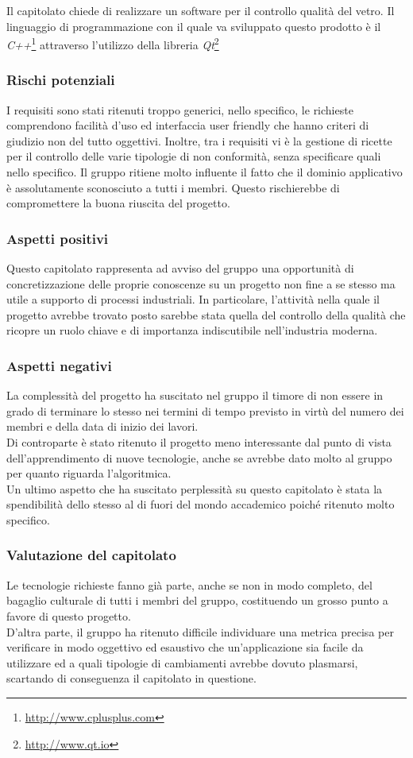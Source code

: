 Il capitolato chiede di realizzare un software per il controllo qualità del vetro. Il linguaggio di programmazione con il quale va sviluppato questo prodotto è il \textit{C++}\footnote{\url{http://www.cplusplus.com}} attraverso l'utilizzo della libreria \textit{Qt}\footnote{\url{http://www.qt.io}}
\subsubsection{Rischi potenziali}
I requisiti sono stati ritenuti troppo generici, nello specifico, le richieste comprendono facilità d'uso ed interfaccia user friendly che hanno criteri di giudizio non del tutto oggettivi.
Inoltre, tra i requisiti vi è la gestione di ricette per il controllo delle varie tipologie di non conformità, senza specificare quali nello specifico.
Il gruppo \GRUPPO{} ritiene molto influente il fatto che il dominio applicativo è assolutamente sconosciuto a tutti i membri. Questo rischierebbe di compromettere la buona riuscita del progetto.
\subsubsection{Aspetti positivi}
Questo capitolato rappresenta ad avviso del gruppo una opportunità di concretizzazione delle proprie conoscenze su un progetto non fine a se stesso ma utile a supporto di processi industriali. In particolare, l'attività nella quale il progetto avrebbe trovato posto sarebbe stata quella del controllo della qualità che ricopre un ruolo chiave e di importanza indiscutibile nell'industria moderna.
\subsubsection{Aspetti negativi}
La complessità del progetto ha suscitato nel gruppo il timore di non essere in grado di terminare lo stesso nei termini di tempo previsto in virtù del numero dei membri e della data di inizio dei lavori. \\
Di controparte è stato ritenuto il progetto meno interessante dal punto di vista dell'apprendimento di nuove tecnologie, anche se avrebbe dato molto al gruppo per quanto riguarda l'algoritmica.\\
Un ultimo aspetto che ha suscitato perplessità su questo capitolato è stata la spendibilità dello stesso al di fuori del mondo accademico poiché ritenuto molto specifico.
\subsubsection{Valutazione del capitolato}
Le tecnologie richieste fanno già parte, anche se non in modo completo, del bagaglio culturale di tutti i membri del gruppo, costituendo un grosso punto a favore di questo progetto. \\
D'altra parte, il gruppo ha ritenuto difficile individuare una metrica precisa per verificare in modo oggettivo ed esaustivo che un'applicazione sia facile da utilizzare ed a quali tipologie di cambiamenti avrebbe dovuto plasmarsi, scartando di conseguenza il capitolato in questione.
